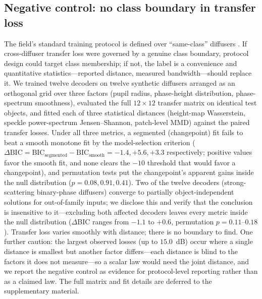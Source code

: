 \subsection{Negative control: no class boundary in transfer loss}
\label{sec:negative}

The field's standard training protocol is defined over ``same-class'' diffusers \cite{li2018deep}. If cross-diffuser transfer loss were governed by a genuine class boundary, protocol design could target class membership; if not, the label is a convenience and quantitative statistics---reported distance, measured bandwidth---should replace it. We trained twelve decoders on twelve synthetic diffusers arranged as an orthogonal grid over three factors (pupil radius, phase-height distribution, phase-spectrum smoothness), evaluated the full $12\times12$ transfer matrix on identical test objects, and fitted each of three statistical distances (height-map Wasserstein, speckle power-spectrum Jensen--Shannon, patch-level MMD) against the paired transfer losses. Under all three metrics, a segmented (changepoint) fit fails to beat a smooth monotone fit by the model-selection criterion ($\Delta\text{BIC} = \text{BIC}_{\text{segmented}} - \text{BIC}_{\text{smooth}} = -1.4, +5.6, +3.3$ respectively; positive values favor the smooth fit, and none clears the $-10$ threshold that would favor a changepoint), and permutation tests put the changepoint's apparent gains inside the null distribution ($p = 0.08, 0.91, 0.41$). Two of the twelve decoders (strong-scattering binary-phase diffusers) converge to partially object-independent solutions for out-of-family inputs; we disclose this and verify that the conclusion is insensitive to it---excluding both affected decoders leaves every metric inside the null distribution ($\Delta$BIC ranges from $-1.1$ to $+0.6$, permutation $p = 0.11$--$0.18$). Transfer loss varies smoothly with distance; there is no boundary to find. One further caution: the largest observed losses (up to $15.0$~dB) occur where a single distance is smallest but another factor differs---each distance is blind to the factors it does not measure---so a scalar law would need the joint distance, and we report the negative control as evidence for protocol-level reporting rather than as a claimed law. The full matrix and fit details are deferred to the supplementary material.

